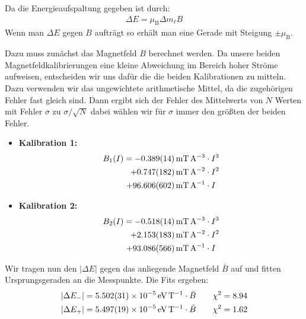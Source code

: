 \documentclass[11pt, a4paper]{article}
\begin{document}
Da die Energieaufspaltung gegeben ist durch:
\begin{align}
	\Delta E = \mu_\mathrm{B} \Delta m_\ell B
\end{align}
Wenn man $\Delta E$ gegen $B$ aufträgt so erhält man eine Gerade mit Steigung $\pm \mu_\mathrm{B}$.

Dazu muss zunächst das Magnetfeld $B$ berechnet werden.
Da unsere beiden Magnetfeldkalibrierungen eine kleine Abweichung im Bereich hoher Ströme aufweisen, entscheiden wir uns dafür die die beiden Kalibrationen zu mitteln.
Dazu verwenden wir das ungewichtete arithmetische Mittel, da die zugehörigen Fehler fast gleich sind.
Dann ergibt sich der Fehler des Mittelwerts von $N$ Werten mit Fehler $\sigma$ zu $\sigma/\sqrt{N}$ dabei wählen wir für $\sigma$ immer den größten der beiden Fehler.

\begin{itemize}
	\item \textbf{Kalibration 1:}
	\begin{align}
	B_1(I) = \SI{-0.389 +- 0.014}{\milli\tesla\per\ampere\cubed} &\cdot I^3 \nonumber\\
	       +\SI{0.747+-0.182}{\milli\tesla\per\ampere\squared} &\cdot I^2 \nonumber\\
	       + \SI{96.606 +- 0.602}{\milli\tesla\per\ampere} &\cdot I
	\end{align}
	\item \textbf{Kalibration 2:}
	\begin{align}
	B_2(I) = \SI{-0.518 +- 0.014}{\milli\tesla\per\ampere\cubed} &\cdot I^3 \nonumber\\
	+\SI{2.153+-0.183}{\milli\tesla\per\ampere\squared} &\cdot I^2 \nonumber\\
	+ \SI{93.086 +- 0.566}{\milli\tesla\per\ampere} &\cdot I
	\end{align}
\end{itemize}

Wir tragen nun den $|\Delta E|$ gegen das anliegende Magnetfeld $\bar{B}$ auf und fitten Ursprungsgeraden an die Messpunkte.
Die Fits ergeben:
\begin{align}
	|\Delta E_{-}| = \SI{5.502 +- 0.031e-5}{\electronvolt\per\tesla} \cdot \bar{B} \qquad \chi^2 = 8.94\\
	|\Delta E_{+}| = \SI{5.497 +- 0.019e-5}{\electronvolt\per\tesla} \cdot \bar{B} \qquad \chi^2 = 1.62
\end{align}
\end{document}
